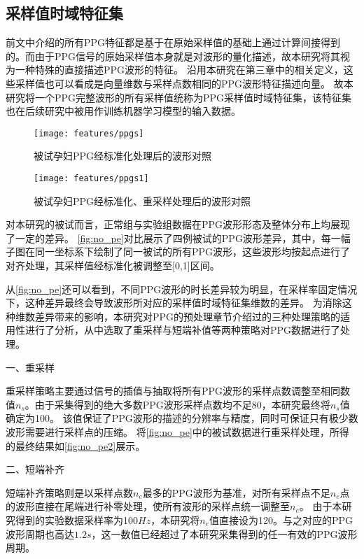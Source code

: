 \subsection{采样值时域特征集}

前文中介绍的所有PPG特征都是基于在原始采样值的基础上通过计算间接得到的。而由于PPG信号的原始采样值本身就是对波形的量化描述，故本研究将其视为一种特殊的直接描述PPG波形的特征。
沿用本研究在第三章中的相关定义，这些采样值也可以看成是向量维数与采样点数相同的PPG波形特征描述向量。
故本研究将一个PPG完整波形的所有采样值统称为PPG采样值时域特征集，该特征集也在后续研究中被用作训练机器学习模型的输入数据。

\begin{figure}[htbp]
  \centering
  \texttt{[image: features/ppgs]}
  \caption{\label{fig:no_pe}被试孕妇PPG经标准化处理后的波形对照}
\end{figure}

\begin{figure}[htbp]
  \centering
  \texttt{[image: features/ppgs1]}
  \caption{\label{fig:no_pe2}被试孕妇PPG经标准化、重采样处理后的波形对照}
\end{figure}

对本研究的被试而言，正常组与实验组数据在PPG波形形态及整体分布上均展现了一定的差异。
\autoref{fig:no_pe}对比展示了四例被试的PPG波形差异，其中，每一幅子图在同一坐标系下绘制了同一被试的所有PPG波形，这些波形均按起点进行了对齐处理，其采样值经标准化被调整至[0,1]区间。

从\autoref{fig:no_pe}还可以看到，不同PPG波形的时长差异较为明显，在采样率固定情况下，这种差异最终会导致波形所对应的采样值时域特征集维数的差异。
为消除这种维数差异带来的影响，本研究对PPG的预处理章节介绍过的三种处理策略的适用性进行了分析，从中选取了重采样与短端补值等两种策略对PPG数据进行了处理。

一、重采样

重采样策略主要通过信号的插值与抽取将所有PPG波形的采样点数调整至相同数值$n_s$。由于采集得到的绝大多数PPG波形采样点数均不足80，本研究最终将$n_s$值确定为100。
该值保证了PPG波形的描述的分辨率与精度，同时可保证只有极少数波形需要进行采样点的压缩。
将\autoref{fig:no_pe}中的被试数据进行重采样处理，所得的最终结果如\autoref{fig:no_pe2}展示。

二、短端补齐

短端补齐策略则是以采样点数$n_e$最多的PPG波形为基准，对所有采样点不足$n_e$点的波形直接在尾端进行补零处理，使所有波形的采样点统一调整至$n_e$。
由于本研究得到的实验数据采样率为100$Hz$，本研究将$n_e$值直接设为120。与之对应的PPG波形周期也高达$1.2 s$，这一数值已经超过了本研究采集得到的任一有效的PPG波形周期。


